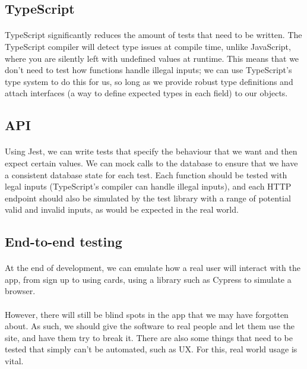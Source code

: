 \documentclass{report}
\begin{document}
\subsection{TypeScript}
\paragraph{}
TypeScript significantly reduces the amount of tests that need to be written. The TypeScript compiler will detect type issues at compile time, unlike JavaScript, where you are silently left with undefined values at runtime. This means that we don't need to test how functions handle illegal inputs; we can use TypeScript's type system to do this for us, so long as we provide robust type definitions and attach interfaces (a way to define expected types in each field) to our objects.

\subsection{API}
\paragraph{}
Using Jest, we can write tests that specify the behaviour that we want and then expect certain values. We can mock calls to the database to ensure that we have a consistent database state for each test. Each function should be tested with legal inputs (TypeScript's compiler can handle illegal inputs), and each HTTP endpoint should also be simulated by the test library with a range of potential valid and invalid inputs, as would be expected in the real world.

\subsection{End-to-end testing}
\paragraph{}
At the end of development, we can emulate how a real user will interact with the app, from sign up to using cards, using a library such as Cypress to simulate a browser.

\paragraph{}
However, there will still be blind spots in the app that we may have forgotten about. As such, we should give the software to real people and let them use the site, and have them try to break it. There are also some things that need to be tested that simply can't be automated, such as UX. For this, real world usage is vital.
\end{document}
